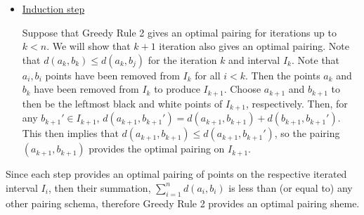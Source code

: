 \begin{solution}
\begin{itemize}[-]
        \item \underline{Induction step}

        Suppose that Greedy Rule 2 gives an optimal pairing for iterations up to $k < n$. We will show that $k+1$ iteration also gives an optimal pairing. Note that $d(a_k, b_k) \leq d(a_k, b_j)$ for the iteration $k$ and interval $I_k$. Note that $a_i, b_i$ points have been removed from $I_k$ for all $i < k$. Then the points $a_k$ and $b_k$ have been removed from $I_k$ to produce $I_{k+1}$. Choose $a_{k+1}$ and $b_{k+1}$ to then be the leftmost black and white points of $I_{k+1}$, respectively. Then, for any $b_{k+1}' \in I_{k+1}$, $d(a_{k+1}, b_{k+1}') = d(a_{k+1}, b_{k+1}) + d(b_{k+1}, b_{k+1}')$. This then implies that $d(a_{k+1}, b_{k+1}) \leq d(a_{k+1}, b_{k+1}')$, so the pairing $(a_{k+1}, b_{k+1})$ provides the optimal pairing on $I_{k+1}$.         
    \end{itemize}

        Since each step provides an optimal pairing of points on the respective iterated interval $I_i$, then their summation, $\sum_{i = 1}^n d(a_i, b_i)$ is less than (or equal to) any other pairing schema, therefore Greedy Rule 2 provides an optimal pairing sheme. 
\end{solution}

\newpage
